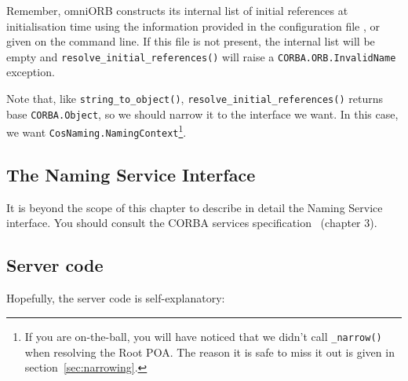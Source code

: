 \documentclass[11pt,oneside,a4paper]{book}
\newcommand{\type}[1]{\texttt{#1}}
\newcommand{\code}[1]{\texttt{#1}}
\newcommand{\op}[1]{\texttt{#1()}}
\newcommand{\dsc}{\discretionary{}{}{}}
\begin{document}
Remember, omniORB constructs its internal list of initial references
at initialisation time using the information provided in the
configuration file , or given on the command
line. If this file is not present, the internal list will be empty and
\op{resolve\_initial\_references} will raise a
\code{CORBA.ORB.\dsc{}InvalidName} exception.

Note that, like \op{string\_to\_object},
\op{resolve\_initial\_references} returns base \type{CORBA.Object}, so
we should narrow it to the interface we want. In this case, we want
\type{CosNaming.NamingContext}\footnote{If you are on-the-ball, you
will have noticed that we didn't call \op{\_narrow} when resolving the
Root POA. The reason it is safe to miss it out is given in
section~\ref{sec:narrowing}.}.


\subsection{The Naming Service Interface}

It is beyond the scope of this chapter to describe in detail the
Naming Service interface. You should consult the CORBA services
specification~\cite{corbaservices} (chapter 3).

\subsection{Server code}

Hopefully, the server code is self-explanatory:
\end{document}
